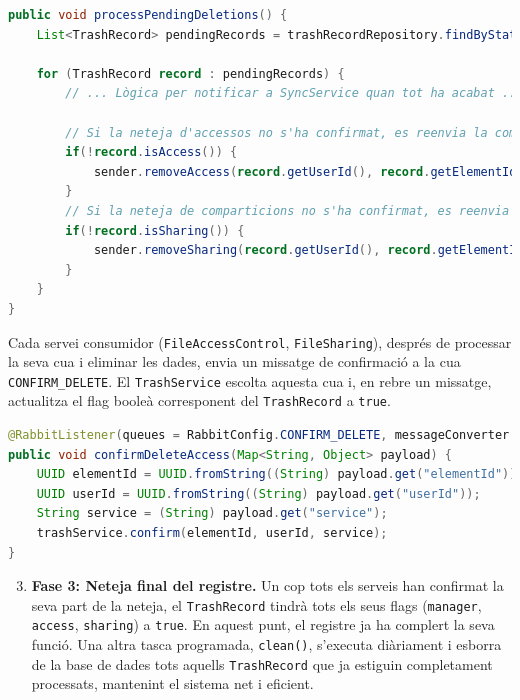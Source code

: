 \begin{lstlisting}[language=Java, caption={Lògica de processament de pendents a `TrashService`}]
public void processPendingDeletions() {
    List<TrashRecord> pendingRecords = trashRecordRepository.findByStatus(RecordStatus.PENDING_DELETION);
    
    for (TrashRecord record : pendingRecords) {
        // ... Lògica per notificar a SyncService quan tot ha acabat ...
        
        // Si la neteja d'accessos no s'ha confirmat, es reenvia la comanda
        if(!record.isAccess()) { 
            sender.removeAccess(record.getUserId(), record.getElementId());
        }
        // Si la neteja de comparticions no s'ha confirmat, es reenvia
        if(!record.isSharing()) { 
            sender.removeSharing(record.getUserId(), record.getElementId());
        }
    }
}
\end{lstlisting}

Cada servei consumidor (\texttt{FileAccessControl}, \texttt{FileSharing}), després de processar la seva cua i eliminar les dades, envia un missatge de confirmació a la cua \texttt{CONFIRM\_DELETE}. El \texttt{TrashService} escolta aquesta cua i, en rebre un missatge, actualitza el flag booleà corresponent del \texttt{TrashRecord} a \texttt{true}.

\begin{lstlisting}[language=Java, caption={Receptor de confirmacions a `TrashService`}]
@RabbitListener(queues = RabbitConfig.CONFIRM_DELETE, messageConverter = "jackson2JsonMessageConverter")
public void confirmDeleteAccess(Map<String, Object> payload) {
    UUID elementId = UUID.fromString((String) payload.get("elementId"));
    UUID userId = UUID.fromString((String) payload.get("userId"));
    String service = (String) payload.get("service");
    trashService.confirm(elementId, userId, service);
}
\end{lstlisting}

\begin{enumerate}
    \setcounter{enumi}{2}
    \item \textbf{Fase 3: Neteja final del registre.} Un cop tots els serveis han confirmat la seva part de la neteja, el \texttt{TrashRecord} tindrà tots els seus flags (\texttt{manager}, \texttt{access}, \texttt{sharing}) a \texttt{true}. En aquest punt, el registre ja ha complert la seva funció. Una altra tasca programada, \texttt{clean()}, s'executa diàriament i esborra de la base de dades tots aquells \texttt{TrashRecord} que ja estiguin completament processats, mantenint el sistema net i eficient.
\end{enumerate}


